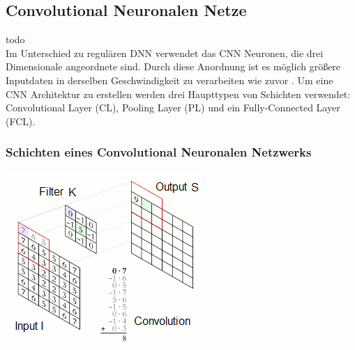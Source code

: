 \documentclass[twosided,a4,10pt]{article}
\begin{document}
\begin{multicols}{2}
		\subsection{Convolutional Neuronalen Netze}
		todo\\
		Im Unterschied zu regulären DNN verwendet das CNN Neuronen, die drei Dimensionale angeordnete sind. Durch diese Anordnung ist es möglich größere Inputdaten in derselben Geschwindigkeit zu verarbeiten wie zuvor \cite{karpathy}. Um eine CNN Architektur zu erstellen werden drei Haupttypen von Schichten verwendet: Convolutional Layer (CL), Pooling Layer (PL) und ein Fully-Connected Layer (FCL).
		
		\subsubsection{Schichten eines Convolutional Neuronalen Netzwerks}
		
		\begin{minipage}{0.45\textwidth}
			\centering
			\includegraphics{img/faltung2.png}
			\label{img:faltung}
		\end{minipage}\newline
	

\end{multicols}
\end{document}
